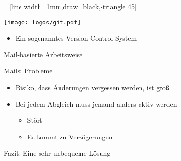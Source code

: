 \newcommand{\mail}{\texttt{[image: figures/mail.pdf]}}
=[line width=1mm,draw=black,-triangle 45]


\begin{frame}
    \centering
    \texttt{[image: logos/git.pdf]}
    
    \vspace{1em}

    \begin{itemize}
      \item Ein sogenanntes Version Control System
    \end{itemize}
\end{frame}

\begin{frame}{Mail-basierte Arbeitsweise}
  \centering
\end{frame}

\begin{frame}{Mails: Probleme}
  \begin{itemize}
    \item Risiko, dass Änderungen vergessen werden, ist groß
    \item Bei jedem Abgleich muss jemand anders aktiv werden
      \begin{itemize}
        \item Stört
        \item Es kommt zu Verzögerungen
      \end{itemize}
  \end{itemize}
  Fazit: Eine sehr unbequeme Lösung
\end{frame}

